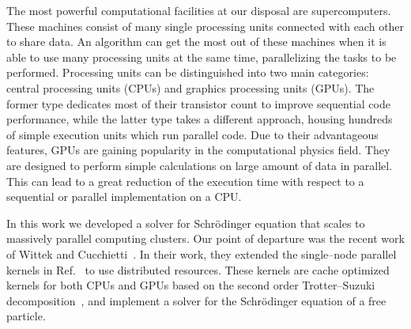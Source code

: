 The most powerful computational facilities at our disposal are supercomputers. These machines consist of many single processing units connected with each other to share data. An algorithm can get the most out of these machines when it is able to use many processing units at the same time, parallelizing the tasks to be performed. Processing units can be distinguished into two main categories: central processing units (CPUs) and graphics processing units (GPUs). The former type dedicates most of their transistor count to improve sequential code performance, while the latter type takes a different approach, housing hundreds of simple execution units which run parallel code. Due to their advantageous features, GPUs are gaining popularity in the computational physics field. They are designed to perform simple calculations on large amount of data in parallel. This can lead to a great reduction of the execution time with respect to a sequential or parallel implementation on a CPU.


In this work we developed a solver for Schr\"odinger equation that scales to	massively parallel computing clusters. Our point of departure was the recent work of Wittek and Cucchietti~\citep{Wittek20131165}. In their work, they extended the single--node parallel kernels in Ref.~\citep{bederian2011boosting} to use distributed resources. These kernels are cache optimized kernels for both CPUs and GPUs based on the second order Trotter--Suzuki decomposition~\citep{Suzuki1992387}, and implement a solver for the Schr\"odinger equation of a free particle. 

